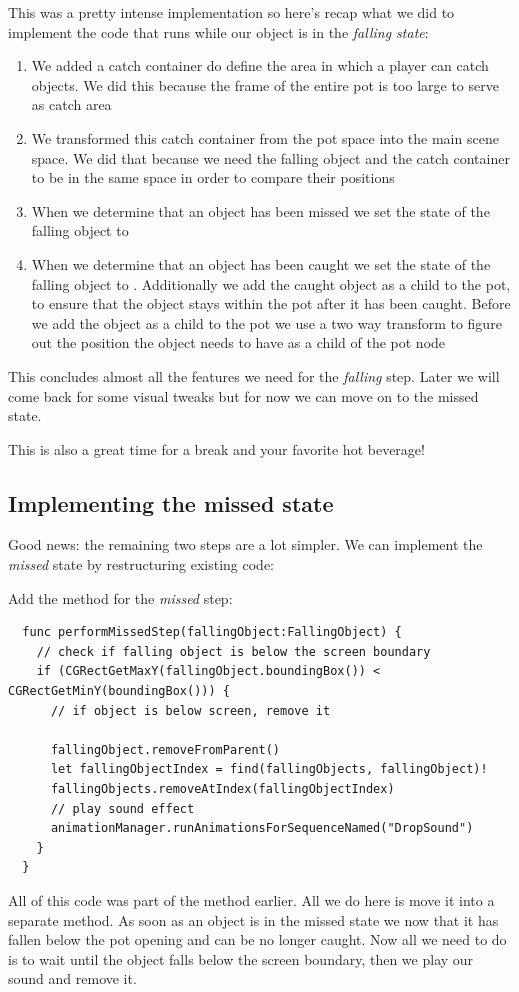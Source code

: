 This was a pretty intense implementation so here's recap what we did to
implement the code that runs while our object is in the \textit{falling state}:
\begin{enumerate}
  \item We added a catch container do define the area in which a player can
  catch objects. We did this because the frame of the entire pot is too large to
  serve as catch area
  \item We transformed this catch container from the pot space into the main
  scene space. We did that because we need the falling object and the catch
  container to be in the same space in order to compare their positions
  \item When we determine that an object has been missed we set the state of the
  falling object to 
  \item When we determine that an object has been caught we set the state of the
  falling object to . Additionally we add the caught object
  as a child to the pot, to ensure that the object stays within the pot after it
  has been caught. Before we add the object as a child to the pot we use a two
  way transform to figure out the position the object needs to have as a child
  of the pot node
\end{enumerate}

This concludes almost all the features we need for the \textit{falling} step.
Later we will come back for some visual tweaks but for now we can move on to the
missed state. 

This is also a great time for a break and your favorite hot
beverage!
\subsection{Implementing the missed state}
Good news: the remaining two steps are a lot simpler. We can implement the
\textit{missed} state by restructuring existing code:
\begin{leftbar}
Add the method for the \textit{missed} step:
\begin{lstlisting}
  func performMissedStep(fallingObject:FallingObject) {
    // check if falling object is below the screen boundary
    if (CGRectGetMaxY(fallingObject.boundingBox()) < CGRectGetMinY(boundingBox())) {
      // if object is below screen, remove it
      
      fallingObject.removeFromParent()
      let fallingObjectIndex = find(fallingObjects, fallingObject)!
      fallingObjects.removeAtIndex(fallingObjectIndex)
      // play sound effect
      animationManager.runAnimationsForSequenceNamed("DropSound")
    }
  }
\end{lstlisting}
\end{leftbar}
All of this code was part of the  method earlier. All we do
here is move it into a separate method. As soon as an object is in the missed
state we now that it has fallen below the pot opening and can be no longer
caught. Now all we need to do is to wait until the object falls below the
screen boundary, then we play our sound and remove it.

